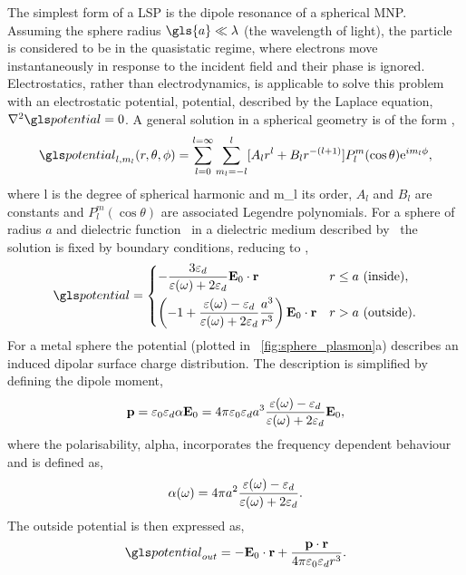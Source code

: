 \documentclass{article}
\begin{document}
The simplest form of a LSP is the dipole resonance of a spherical MNP. Assuming the sphere radius $\gls{a}\ll\lambda$ (the wavelength of light), the particle is considered to be in the quasistatic regime, where electrons move instantaneously in response to the incident field and their phase is ignored. Electrostatics, rather than electrodynamics, is applicable to solve this problem with an electrostatic potential, \gls{potential},  described by the Laplace equation, $\nabla^2\pot=0$. A general solution in a spherical geometry is of the form \cite{maier2007plasmonics},
\begin{equation}
	\pot_{l,m_l}(r,\theta,\phi) = \sum_{l=0}^{l=\infty} \sum_{m_l=-l}^l [ A_lr^l + B_lr^{-(l+1)} ] P_l^m (\cos\theta) \e^{i m_l\phi},
\end{equation}
where \gls{l} is the degree of spherical harmonic and \gls{m_l} its order, $A_l$ and $B_l$ are constants and $P_l^m(\cos\theta)$ are associated Legendre polynomials. For a sphere of radius $a$ and dielectric function \dielectric\ in a dielectric medium described by \epsdi\ the solution is fixed by boundary conditions, reducing to \cite{jackson1999classical},
\begin{equation}
	\pot =
	\begin{dcases}
	-\frac{3\epsdi}{\dielectric + 2\epsdi} \vec{E}_0\cdot\vec{r} & r \leq a\text{ (inside)}, \\
	\left(-1 + \frac{\dielectric - \epsdi}{\dielectric + 2\epsdi} \frac{a^3}{r^3}\right) \vec{E}_0\cdot\vec{r} & r > a\text{ (outside)}.
	\end{dcases}
\end{equation}
For a metal sphere the potential (plotted in \figurename~\ref{fig:sphere_plasmon}a) describes an induced dipolar surface charge distribution. The description is simplified by defining the dipole moment,
\begin{equation}
	\mathbf{p} = \varepsilon_0\varepsilon_d\alpha\mathbf{E}_0 = 4\pi\varepsilon_0\varepsilon_d a^3 \frac{\varepsilon(\omega) - \varepsilon_d}{\varepsilon(\omega) + 2\varepsilon_d} \mathbf{E}_0,
\end{equation}
where the polarisability, \gls{alpha}, incorporates the frequency dependent behaviour and is defined as,
\begin{equation}
	\alpha(\omega) = 4\pi a^2 \frac{\varepsilon(\omega) - \varepsilon_d}{\varepsilon(\omega) + 2\varepsilon_d}.
	\label{eq:polarisability}
\end{equation}
The outside potential is then expressed as,
\begin{equation}
	\pot_{out} = -\vec{E}_0\cdot\vec{r} + \frac{\vec{p}\cdot\vec{r}}{4\pi\epsfs\epsdi r^3}.
\end{equation}
\end{document}

